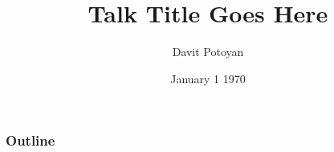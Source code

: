 \usepackage[export]{adjustbox}
\title{Talk Title Goes Here}
\author{Davit Potoyan}
\date{January 1 1970}

\providecommand{\tightlist}{%
  \setlength{\itemsep}{0pt}\setlength{\parskip}{0pt}}


\begin{frame}
\titlepage
\end{frame}

\begin{frame}
\frametitle{Outline}
\tableofcontents
\end{frame}




